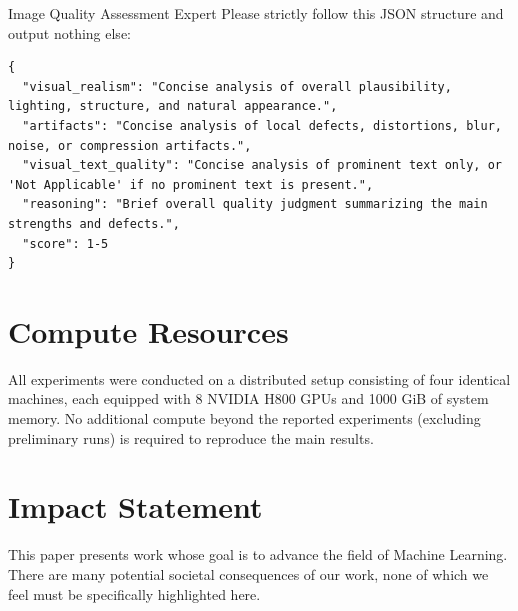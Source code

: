 \documentclass{llmxive}
\begin{document}
\begin{promptbox}[label={System Prompts: Visual Quality}]{Image Quality Assessment Expert}
Please strictly follow this JSON structure and output nothing else:

\begin{lstlisting}
{
  "visual_realism": "Concise analysis of overall plausibility, lighting, structure, and natural appearance.",
  "artifacts": "Concise analysis of local defects, distortions, blur, noise, or compression artifacts.",
  "visual_text_quality": "Concise analysis of prominent text only, or 'Not Applicable' if no prominent text is present.",
  "reasoning": "Brief overall quality judgment summarizing the main strengths and defects.",
  "score": 1-5
}
\end{lstlisting}

\end{promptbox}

\section{Compute Resources}
\label{supp:ComputeResources}
All experiments were conducted on a distributed setup consisting of four identical machines, each equipped with 8 NVIDIA H800 GPUs and 1000 GiB of system memory. No additional compute beyond the reported experiments (excluding preliminary runs) is required to reproduce the main results.

\section{Impact Statement}
\label{supp:impact}
This paper presents work whose goal is to advance the field of Machine Learning. There are many potential societal consequences of our work, none of which we feel must be specifically highlighted here.
\end{document}

